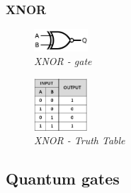 \documentclass{article}
\begin{document}
\subsubsection{XNOR}
\begin{figure}[h]
\begin{center}
\begin{minipage}[b]{4cm}
\centering
\includegraphics[width=2cm]{xnor_gate.png}\\\textit{XNOR - gate}
\end{minipage}
\begin{minipage}[b]{2cm}
\centering
\includegraphics[width=2cm]{xnor_truthtable.png}\\\textit{XNOR - Truth Table}
\end{minipage}
\end{center}
\end{figure}
\newpage
\subsection{Quantum gates}
\end{document}
